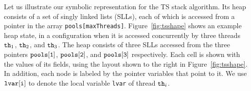 Let us illustrate our symbolic representation for the TS stack algorithm.
Its heap consists of a set of singly linked lists (SLLs), each of which
is accessed from a pointer in the array {\tt pools[maxThreads]}.
Figure~\ref{fig:tsshape} shows an example heap state,
in a configuration when %
it is accessed concurrently by three threads ${\tt th}_1$, ${\tt th}_2$, and ${\tt th}_3$. The heap consists of three SLLs accessed from the three pointers $\tt pools[1]$, $\tt pools[2]$, and $\tt pools[3]$ respectively. Each cell is
shown with the values of its fields, using the layout shown to the right in
Figure~\ref{fig:tsshape}.
In addition, each node is labeled by the
pointer variables that point to it. We use ${\tt lvar[i]}$ to denote the local
variable {\tt lvar} of thread ${\tt th}_i$.

